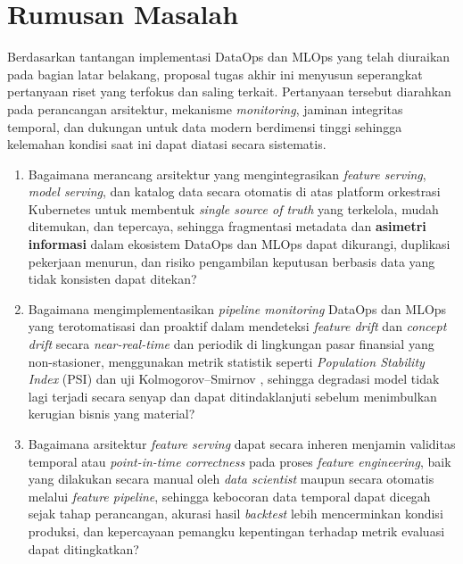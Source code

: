 \section{Rumusan Masalah}

Berdasarkan tantangan implementasi DataOps dan MLOps yang telah diuraikan pada bagian latar belakang, proposal tugas akhir ini menyusun seperangkat pertanyaan riset yang terfokus dan saling terkait. Pertanyaan tersebut diarahkan pada perancangan arsitektur, mekanisme \textit{monitoring}, jaminan integritas temporal, dan dukungan untuk data modern berdimensi tinggi sehingga kelemahan kondisi saat ini dapat diatasi secara sistematis.

\vspace{0.5em}
\begin{enumerate}
    \item Bagaimana merancang arsitektur yang mengintegrasikan \textit{feature serving}, \textit{model serving}, dan katalog data secara otomatis di atas platform orkestrasi Kubernetes untuk membentuk \textit{single source of truth} yang terkelola, mudah ditemukan, dan tepercaya, sehingga fragmentasi metadata dan \textbf{asimetri informasi} dalam ekosistem DataOps dan MLOps dapat dikurangi, duplikasi pekerjaan menurun, dan risiko pengambilan keputusan berbasis data yang tidak konsisten dapat ditekan?
    
    \vspace{0.5em}
    
    \item Bagaimana mengimplementasikan \textit{pipeline monitoring} DataOps dan MLOps yang terotomatisasi dan proaktif dalam mendeteksi \textit{feature drift} dan \textit{concept drift} secara \textit{near-real-time} dan periodik di lingkungan pasar finansial yang non-stasioner, menggunakan metrik statistik seperti \textit{Population Stability Index} (PSI) dan uji Kolmogorov--Smirnov \autocite{cespedes2024efficient}, sehingga degradasi model tidak lagi terjadi secara senyap dan dapat ditindaklanjuti sebelum menimbulkan kerugian bisnis yang material?
    
    \vspace{0.5em}

    \item Bagaimana arsitektur \textit{feature serving} dapat secara inheren menjamin validitas temporal atau \textit{point-in-time correctness} pada proses \textit{feature engineering}, baik yang dilakukan secara manual oleh \textit{data scientist} maupun secara otomatis melalui \textit{feature pipeline}, sehingga kebocoran data temporal dapat dicegah sejak tahap perancangan, akurasi hasil \textit{backtest} lebih mencerminkan kondisi produksi, dan kepercayaan pemangku kepentingan terhadap metrik evaluasi dapat ditingkatkan?
    

\end{enumerate}
